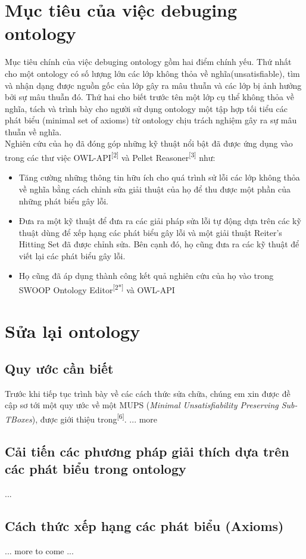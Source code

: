 \section{Mục tiêu của việc debuging ontology}
Mục tiêu chính của việc debuging ontology gồm hai điểm chính yếu. Thứ nhất cho một ontology có số lượng lớn các lớp không thỏa về nghĩa(unsatisfiable), tìm và nhận dạng được nguồn gốc của lớp gây ra mâu thuẫn và các lớp bị ảnh hưởng bởi sự mâu thuẫn đó. Thứ hai cho biết trước tên một lớp cụ thể không thỏa về nghĩa, tách và trình bày cho người sử dụng ontology một tập hợp tối tiểu các phát biểu (minimal set of axioms) từ ontology chịu trách nghiệm gây ra sự mâu thuẫn về nghĩa.
\\
Nghiên cứu của họ đã đóng góp những kỹ thuật nổi bật đã được ứng dụng vào trong các thư việc OWL-API\textsuperscript{[2]} và Pellet Reasoner\textsuperscript{[3]} như:
\begin{itemize}
\item
Tăng cường những thông tin hữu ích cho quá trình sử lỗi các lớp không thỏa về nghĩa bằng cách chỉnh sửa giải thuật của họ để thu được một phần của những phát biểu gây lỗi.
\item
Đưa ra một kỹ thuật để đưa ra các giải pháp sửa lỗi tự động dựa trên các kỹ thuật dùng để xếp hạng các phát biểu gây lỗi và một giải thuật Reiter's Hitting Set đã được chỉnh sửa. Bên cạnh đó, họ cũng đưa ra các kỹ thuật để viết lại các phát biểu gây lỗi.
\item
Họ cũng đã áp dụng thành công kết quả nghiên cứu của họ vào trong SWOOP Ontology Editor\textsuperscript{[2*]} và OWL-API
\end{itemize}
\section{Sửa lại ontology}

\subsection{Quy ước cần biết}
Trước khi tiếp tục trình bày về các cách thức sửa chữa, chúng em xin được đề cập sơ tới một quy ước về một MUPS (\textit{Minimal Unsatisfiability Preserving Sub-TBoxes}), được giới thiệu trong\textsuperscript{[6]}.
... more 
\subsection{Cải tiến các phương pháp giải thích dựa trên các phát biểu trong ontology}
... 
\subsection{Cách thức xếp hạng các phát biểu (Axioms)}
... more to come ...
